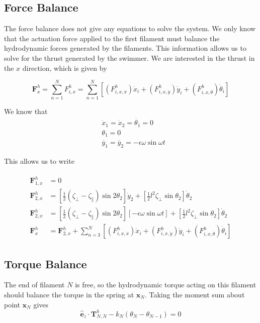 \documentclass[12pt,letterpaper,titlepage]{article}
\newcommand{\uvec}[1]{\mathbf{\hat{#1}}}
\begin{document}
\subsection{Force Balance}
The force balance does not give any equations to solve the system. We only know that the actuation force applied to the first filament must balance the hydrodynamic forces generated by the filaments. This information allows us to solve for the thrust generated by the swimmer. We are interested in the thrust in the $x$ direction, which is given by

\begin{equation}
\mathbf{F}_x^h = \sum_{n=1}^{N} F_{i,x}^h = \sum_{n=1}^{N} [(F_{i,x,\dot{x}}^h) \dot{x}_i + (F_{i,x,\dot{y}}^h) \dot{y}_i + (F_{i,x,\dot{\theta}}^h) \dot{\theta}_i]
\end{equation}

We know that
\begin{align*}
&\dot{x}_1 = \dot{x}_2 = \dot{\theta_1} = 0 \\
&\theta_1 = 0 \\
&\dot{y_1} = \dot{y_2} = -\epsilon \omega \sin \omega t
\end{align*}

This allows us to write

\begin{align}
\begin{split}
\mathbf{F}_{1,x}^h &= 0 \\
\mathbf{F}_{2,x}^h &= [\frac{1}{2} (\zeta_{\bot} - \zeta_{\parallel}) \sin 2 \theta_2] \dot{y}_2 + [\frac{1}{2} l^2 \zeta_{\bot} \sin \theta_2] \dot{\theta}_2 \\
\mathbf{F}_{2,x}^h &= [\frac{1}{2} (\zeta_{\bot} - \zeta_{\parallel}) \sin 2 \theta_2] [-\epsilon \omega \sin \omega t] + [\frac{1}{2} l^2 \zeta_{\bot} \sin \theta_2] \dot{\theta}_2 \\
\mathbf{F}_{x}^h &= \mathbf{F}_{2,x}^h +  \sum_{n=3}^{N} [(F_{i,x,\dot{x}}^h) \dot{x}_i + (F_{i,x,\dot{y}}^h) \dot{y}_i + (F_{i,x,\dot{\theta}}^h) \dot{\theta}_i]
\end{split}
\end{align}

\subsection{Torque Balance}
The end of filament $N$ is free, so the hydrodynamic torque acting on this filament should balance the torque in the spring at $\mathbf{x}_N$. Taking the moment sum about point $\mathbf{x}_N$ gives
\begin{equation}
\uvec{e}_z  \cdot \mathbf{T}_{N,N}^h - k_N(\theta_N - \theta_{N-1}) = 0
\end{equation}
\end{document}
